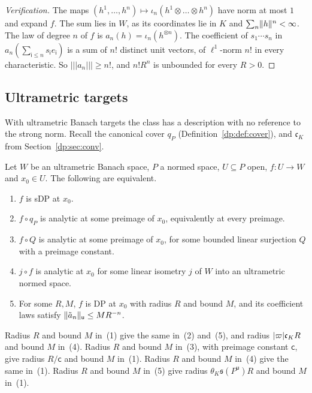\begin{proof}[Verification]
The maps $(h^1,\dots,h^n)\mapsto\iota_n(h^1\otimes\dots\otimes h^n)$ have norm at most $1$ and expand $f$. The sum lies in $W$, as its coordinates lie in $K$ and $\sum_n\lVert h\rVert^n<\infty$. The law of degree $n$ of $f$ is $a_n(h)=\iota_n(h^{\otimes n})$. The coefficient of $s_1\cdots s_n$ in $a_n(\sum_{\mathsf i\le n}s_{\mathsf i}e_{\mathsf i})$ is a sum of $n!$ distinct unit vectors, of $\ell^1$-norm $n!$ in every characteristic. So $\lvert\!\lvert\!\lvert a_n\rvert\!\rvert\!\rvert\ge n!$, and $n!R^n$ is unbounded for every $R>0$.
\end{proof}

\subsection{Ultrametric targets}\label{dp:s:ssec-targets}

With ultrametric Banach targets the class has a description with no reference to the strong norm. Recall the canonical cover $q_P$ (Definition~\ref{dp:def:cover}), and $\mathfrak c_K$ from Section~\ref{dp:sec:conv}.

\begin{theorem}\label{dp:thm:strong-um}
Let $W$ be an ultrametric Banach space, $P$ a normed space, $U\subseteq P$ open, $f\colon U\to W$ and $x_0\in U$. The following are equivalent.
\begin{enumerate}
\item $f$ is sDP at $x_0$.
\item $f\circ q_P$ is analytic at some preimage of $x_0$, equivalently at every preimage.
\item $f\circ Q$ is analytic at some preimage of $x_0$, for some bounded linear surjection $Q$ with a preimage constant.
\item $j\circ f$ is analytic at $x_0$ for some linear isometry $j$ of $W$ into an ultrametric normed space.
\item For some $R,M$, $f$ is DP at $x_0$ with radius $R$ and bound $M$, and its coefficient laws satisfy $\lVert \tilde a_n\rVert_{\mathsf u}\le MR^{-n}$.
\end{enumerate}
Radius $R$ and bound $M$ in~\textup{(1)} give the same in~\textup{(2)} and~\textup{(5)}, and radius $\lvert \varpi\rvert\mathfrak c_KR$ and bound $M$ in~\textup{(4)}. Radius $R$ and bound $M$ in~\textup{(3)}, with preimage constant $\mathsf c$, give radius $R/\mathsf c$ and bound $M$ in~\textup{(1)}. Radius $R$ and bound $M$ in~\textup{(4)} give the same in~\textup{(1)}. Radius $R$ and bound $M$ in~\textup{(5)} give radius $\theta_K\mathfrak s(P^{\mathsf u})R$ and bound $M$ in~\textup{(1)}.
\end{theorem}

